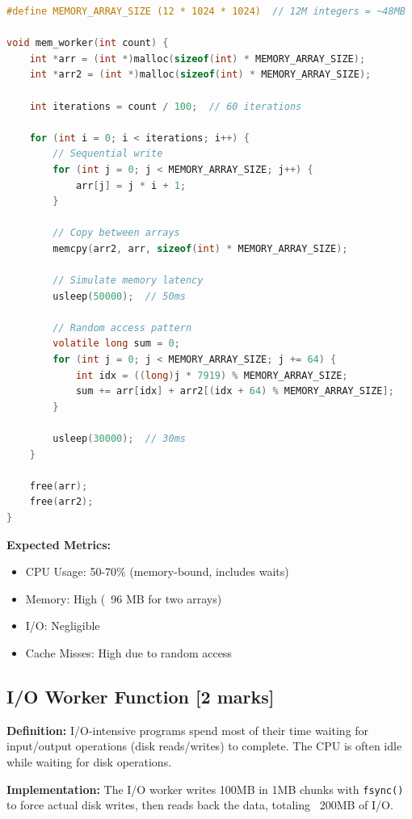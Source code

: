 \documentclass[12pt,a4paper]{article}
\begin{document}
\begin{lstlisting}[language=C, caption=Memory Worker Implementation]
#define MEMORY_ARRAY_SIZE (12 * 1024 * 1024)  // 12M integers = ~48MB

void mem_worker(int count) {
    int *arr = (int *)malloc(sizeof(int) * MEMORY_ARRAY_SIZE);
    int *arr2 = (int *)malloc(sizeof(int) * MEMORY_ARRAY_SIZE);
    
    int iterations = count / 100;  // 60 iterations
    
    for (int i = 0; i < iterations; i++) {
        // Sequential write
        for (int j = 0; j < MEMORY_ARRAY_SIZE; j++) {
            arr[j] = j * i + 1;
        }
        
        // Copy between arrays
        memcpy(arr2, arr, sizeof(int) * MEMORY_ARRAY_SIZE);
        
        // Simulate memory latency
        usleep(50000);  // 50ms
        
        // Random access pattern
        volatile long sum = 0;
        for (int j = 0; j < MEMORY_ARRAY_SIZE; j += 64) {
            int idx = ((long)j * 7919) % MEMORY_ARRAY_SIZE;
            sum += arr[idx] + arr2[(idx + 64) % MEMORY_ARRAY_SIZE];
        }
        
        usleep(30000);  // 30ms
    }
    
    free(arr);
    free(arr2);
}
\end{lstlisting}

\textbf{Expected Metrics:}
\begin{itemize}
    \item CPU Usage: 50-70\% (memory-bound, includes waits)
    \item Memory: High (~96 MB for two arrays)
    \item I/O: Negligible
    \item Cache Misses: High due to random access
\end{itemize}

\subsection{I/O Worker Function [2 marks]}

\textbf{Definition:} I/O-intensive programs spend most of their time waiting 
for input/output operations (disk reads/writes) to complete. The CPU is often
idle while waiting for disk operations.

\textbf{Implementation:} The I/O worker writes 100MB in 1MB chunks with \texttt{fsync()}
to force actual disk writes, then reads back the data, totaling ~200MB of I/O.
\end{document}
